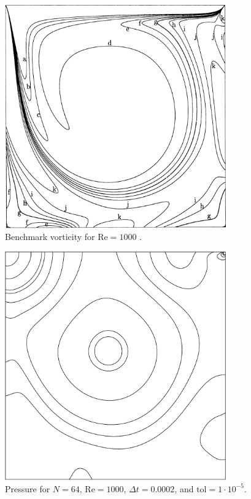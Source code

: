 \begin{figure}[p]
    \centering
    \includegraphics[width=0.85\textwidth]{Images/vorticity.png}
    \caption{Benchmark vorticity for $\text{Re} = 1000$ \parencite{botella1998benchmark}.}
    \label{fig:benchmarkVN64}
\end{figure}

\begin{figure}[p]
    \centering
    \includegraphics[width=0.85\textwidth]{Images/pressure.pdf}
    \caption{Pressure for $N = 64$, $\text{Re} = 1000$, $\Delta t = 0.0002$, and $\text{tol} = 1 \cdot 10^{-5}$.}
    \label{fig:PN64}
\end{figure}

